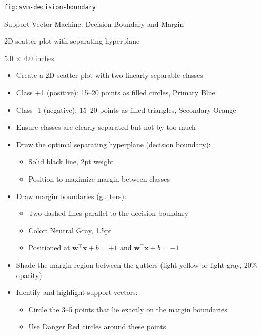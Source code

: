 \documentclass[12pt]{article}
\begin{document}
\begin{description}[style=nextline, leftmargin=0pt]
    \item[Figure ID] \texttt{fig:svm-decision-boundary}
    \item[Title] Support Vector Machine: Decision Boundary and Margin
    \item[Type] 2D scatter plot with separating hyperplane
    \item[Size] 5.0 $\times$ 4.0 inches

    \item[Visual Description]
    \begin{itemize}
        \item Create a 2D scatter plot with two linearly separable classes
        \item Class +1 (positive): 15--20 points as filled circles, Primary Blue
        \item Class -1 (negative): 15--20 points as filled triangles, Secondary Orange
        \item Ensure classes are clearly separated but not by too much
        \item Draw the optimal separating hyperplane (decision boundary):
        \begin{itemize}
            \item Solid black line, 2pt weight
            \item Position to maximize margin between classes
        \end{itemize}
        \item Draw margin boundaries (gutters):
        \begin{itemize}
            \item Two dashed lines parallel to the decision boundary
            \item Color: Neutral Gray, 1.5pt
            \item Positioned at $\mathbf{w}^\top \mathbf{x} + b = +1$ and $\mathbf{w}^\top \mathbf{x} + b = -1$
        \end{itemize}
        \item Shade the margin region between the gutters (light yellow or light gray, 20\% opacity)
        \item Identify and highlight support vectors:
        \begin{itemize}
            \item Circle the 3--5 points that lie exactly on the margin boundaries
            \item Use Danger Red circles around these points

\end{itemize}
\end{itemize}
\end{description}
\end{document}

